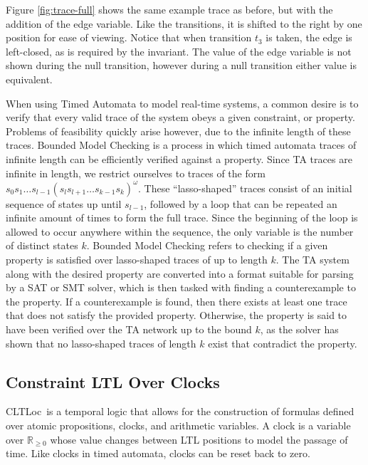 \documentclass[a4paper,12pt]{article}
\newcommand{\cltloc}{CLTLoc}
\begin{document}
Figure \ref{fig:trace-full} shows the same example trace as before, but with the
addition of the edge variable. Like the transitions, it is shifted to the right
by one position for ease of viewing. Notice that when transition $t_{3}$ is
taken, the edge is left-closed, as is required by the invariant. The value of
the edge variable is not shown during the null transition, however during a null
transition either value is equivalent.


When using Timed Automata to model real-time systems, a common desire is to
verify that every valid trace of the system obeys a given constraint, or
property. Problems of feasibility quickly arise however, due to the infinite
length of these traces. Bounded Model Checking is a process in which
timed automata traces of infinite length can be efficiently verified against a
property. Since TA traces are infinite in
length, we restrict ourselves to traces of the form
\(s_0 s_1\ldots s_{l-1}{(s_l s_{l+1}\ldots s_{k-1}s_k)}^\omega\). These
``lasso-shaped'' traces consist of an initial sequence of states up until
\(s_{l-1}\), followed by a loop that can be repeated an infinite amount of times
to form the full trace. Since the beginning of the loop is allowed to occur
anywhere within the sequence, the only variable is the number of distinct states
\(k\). Bounded Model Checking refers to checking if a given property is
satisfied over lasso-shaped traces of up to length \(k\).
The TA system along with the desired property are converted into a
format suitable for parsing by a SAT or SMT solver, which is then tasked
with finding a counterexample to the property. If a counterexample is
found, then there exists at least one trace that does not satisfy the provided
property. Otherwise, the property is said to have been verified over the TA
network up to the bound \(k\), as the solver has shown that no lasso-shaped
traces of length \(k\) exist that contradict the property.

\subsection{Constraint LTL Over Clocks}\label{cltloc}

\cltloc\ is a temporal logic that allows for the construction of formulas
defined over atomic propositions, clocks, and arithmetic variables. A clock is a
variable over \(\mathbb{R}_{\geq 0}\) whose value changes between LTL positions
to model the passage of time. Like clocks in timed automata, clocks can be
reset back to zero.
\end{document}
